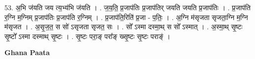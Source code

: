 \documentclass[17pt]{extarticle}
\begin{document}
53. अ॒भि ज॑यति जय त्य॒भ्य॑भि ज॑यति । . ज॒य॒ति॒ प्र॒जाप॑तिः प्र॒जाप॑तिर् जयति जयति प्र॒जाप॑तिः । . प्र॒जाप॑ति र॒ग्नि म॒ग्निम् प्र॒जाप॑तिः प्र॒जाप॑ति र॒ग्निम् । . प्र॒जाप॑ति॒रिति॑ प्र॒जा - प॒तिः॒ । . अ॒ग्नि म॑सृजता सृजता॒ग्नि म॒ग्नि म॑सृजत । . अ॒सृ॒ज॒त॒ स सो॑ ऽसृजता सृजत॒ सः । . सो᳚ ऽस्मा दस्मा॒थ् स सो᳚ ऽस्मात् । . अ॒स्मा॒थ् सृ॒ष्टः सृ॒ष्टो᳚ ऽस्मा दस्माथ् सृ॒ष्टः । . सृ॒ष्टः परा॒ङ् परा᳚ङ् ख्सृ॒ष्टः सृ॒ष्टः पराङ्॑ । \newline

\textbf{Ghana Paata } \newline
\end{document}
